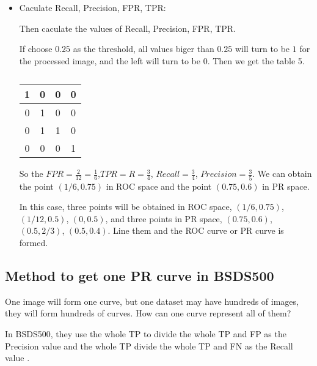 \documentclass[a4paper,12pt]{article}
\begin{document}
\begin{itemize}
\item Caculate Recall, Precision, FPR, TPR: 

Then caculate the values of Recall, Precision, FPR, TPR.

If choose $0.25$ as the threshold, all values biger than $0.25$ will turn to be $1$ for the processed image, and the left will turn to be $0$. Then we get the table 5.
\begin{table}[h]
\centering
\caption{}
\begin{tabular}{|c|c|c|c|}
\hline
1&0&0&0\\
\hline
0&1&0&0\\
\hline
0&1&1&0\\
\hline
0&0&0&1\\
\hline
\end{tabular} 
\end{table}


So the $FPR=\frac{2}{12}=\frac{1}{6}$,$TPR=R=\frac{3}{4}$, $Recall=\frac{3}{4}$, $Precision=\frac{3}{5}$. We can obtain the point $(1/6,0.75)$ in ROC space and the point $(0.75,0.6)$ in PR space.

In this case, three points will be obtained in ROC space, $(1/6,0.75)$, $(1/12,0.5)$, $(0,0.5)$, and three points in PR space, $(0.75,0.6)$, $(0.5,2/3)$, $(0.5,0.4)$. Line them and the ROC curve or PR curve is formed.
\end{itemize}

\subsection{Method to get one PR curve in BSDS500}
One image will form one curve, but one dataset may have hundreds of images, they will form hundreds of curves. How can one curve represent all of them?

In BSDS500, they use the whole TP to divide the whole TP and FP as the Precision value and the whole TP divide the whole TP and FN as the Recall value \cite{4:article}.
\end{document}
